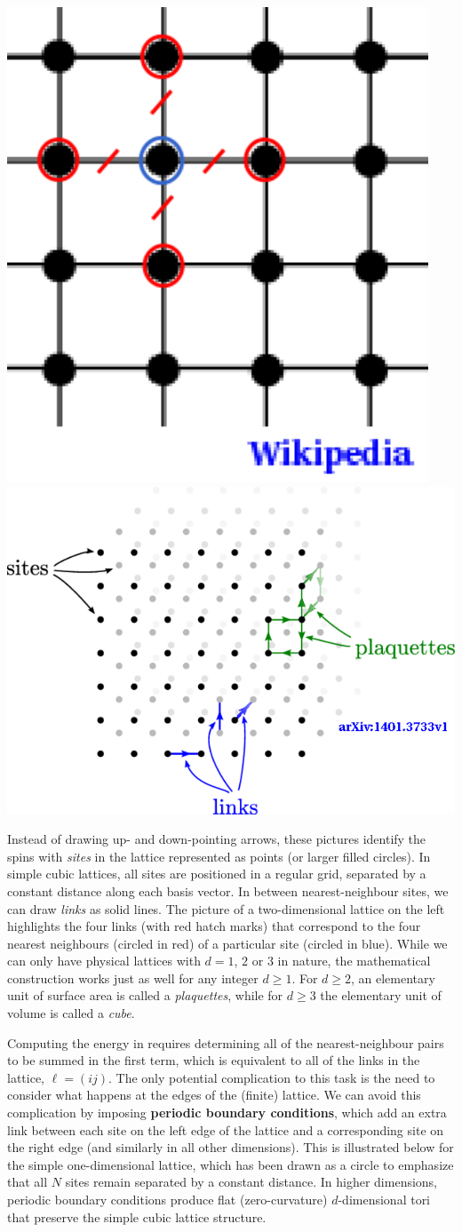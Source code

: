 \begin{center}
  \includegraphics[height=0.4\textwidth]{figs/week10_lattice_2d.pdf}\hfill
  \includegraphics[height=0.4\textwidth]{figs/week10_lattice_3d.pdf}
\end{center}

Instead of drawing up- and down-pointing arrows, these pictures identify the spins with \textit{sites} in the lattice represented as points (or larger filled circles).
In simple cubic lattices, all sites are positioned in a regular grid, separated by a constant distance along each basis vector.
In between nearest-neighbour sites, we can draw \textit{links} as solid lines.
The picture of a two-dimensional lattice on the left highlights the four links (with red hatch marks) that correspond to the four nearest neighbours (circled in red) of a particular site (circled in blue).
While we can only have physical lattices with $d = 1$, $2$ or $3$ in nature, the mathematical construction works just as well for any integer $d \geq 1$.
For $d \geq 2$, an elementary unit of surface area is called a \textit{plaquettes}, while for $d \geq 3$ the elementary unit of volume is called a \textit{cube}.

Computing the energy in  requires determining all of the nearest-neighbour pairs to be summed in the first term, which is equivalent to all of the links in the lattice, $\ell = (ij)$.
The only potential complication to this task is the need to consider what happens at the edges of the (finite) lattice.
We can avoid this complication by imposing \textbf{periodic boundary conditions}, which add an extra link between each site on the left edge of the lattice and a corresponding site on the right edge (and similarly in all other dimensions).
This is illustrated below for the simple one-dimensional lattice, which has been drawn as a circle to emphasize that all $N$ sites remain separated by a constant distance.
In higher dimensions, periodic boundary conditions produce flat (zero-curvature) $d$-dimensional tori that preserve the simple cubic lattice structure.

